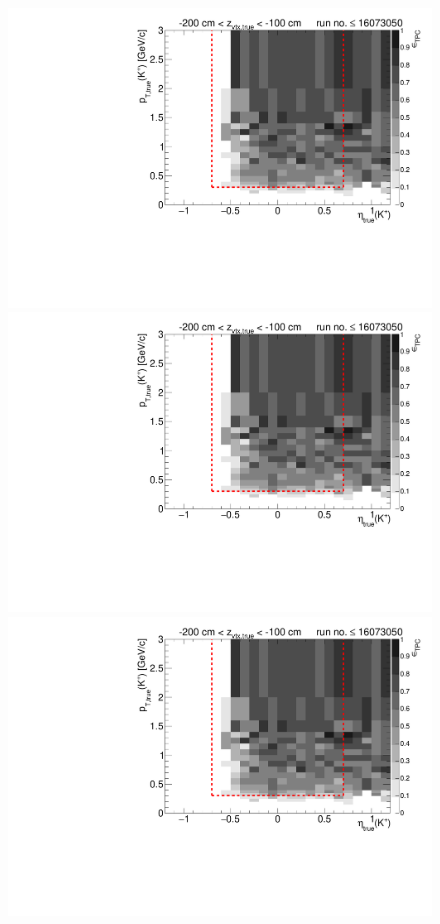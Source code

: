 \begin{figure}[hb]
{  \includegraphics[width=\linewidth,page=6]{graphics/eff/Eff2D_TPC_kaon_Plus_RunRange1.pdf}\\
  \includegraphics[width=\linewidth,page=8]{graphics/eff/Eff2D_TPC_kaon_Plus_RunRange1.pdf}\\
  \includegraphics[width=\linewidth,page=10]{graphics/eff/Eff2D_TPC_kaon_Plus_RunRange1.pdf}
}%
\end{figure}
